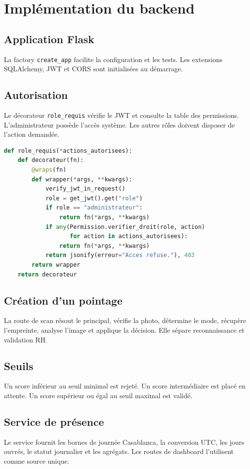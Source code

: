 \documentclass[11pt,a4paper,oneside]{report}
\begin{document}
\chapter{Implémentation du backend}
\section{Application Flask}
La factory \texttt{create\_app} facilite la configuration et les tests. Les extensions SQLAlchemy, JWT et CORS sont initialisées au démarrage.
\section{Autorisation}
Le décorateur \texttt{role\_requis} vérifie le JWT et consulte la table des permissions. L'administrateur possède l'accès système. Les autres rôles doivent disposer de l'action demandée.
\begin{lstlisting}[language=Python,caption={Contrôle d'accès simplifié}]
def role_requis(*actions_autorisees):
    def decorateur(fn):
        @wraps(fn)
        def wrapper(*args, **kwargs):
            verify_jwt_in_request()
            role = get_jwt().get("role")
            if role == "administrateur":
                return fn(*args, **kwargs)
            if any(Permission.verifier_droit(role, action)
                   for action in actions_autorisees):
                return fn(*args, **kwargs)
            return jsonify(erreur="Acces refuse."), 403
        return wrapper
    return decorateur
\end{lstlisting}
\section{Création d'un pointage}
La route de scan résout le principal, vérifie la photo, détermine le mode, récupère l'empreinte, analyse l'image et applique la décision. Elle sépare reconnaissance et validation RH.
\section{Seuils}
Un score inférieur au seuil minimal est rejeté. Un score intermédiaire est placé en attente. Un score supérieur ou égal au seuil maximal est validé.
\section{Service de présence}
Le service fournit les bornes de journée Casablanca, la conversion UTC, les jours ouvrés, le statut journalier et les agrégats. Les routes de dashboard l'utilisent comme source unique.
\end{document}
